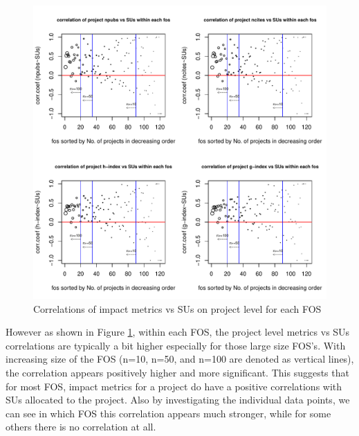 \documentclass{sig-alternate}
\begin{document}
\begin{figure}[!htb] 
  \centering 
    \includegraphics[width=1.0\columnwidth]{images/06_corr_metrics_vs_alloc_proj_by_fos.pdf} 
  \caption{Correlations of impact metrics vs SUs on project level for each FOS}\label{F:corr-metrics-vs-alloc-proj-by-fos} 
\end{figure} 
 
However as shown in Figure \ref{F:corr-metrics-vs-alloc-proj-by-fos}, within each FOS, the project level metrics vs SUs correlations are typically a bit higher especially for those large size FOS's. With increasing size of the FOS (n=10, n=50, and n=100 are denoted as vertical lines), the correlation appears positively higher and more significant. This suggests that for most FOS, impact metrics for a project do have a positive correlations with SUs allocated to the project. Also by investigating the individual data points, we can see in which FOS this correlation appears much stronger, while for some others there is no correlation at all.
 
 
 
\end{document}
